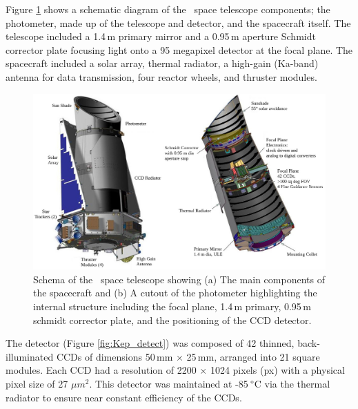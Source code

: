 Figure \ref{fig:KepSchema} shows a schematic diagram of the \Kepler~space telescope components; the photometer, made up of the telescope and detector, and the spacecraft itself.  The telescope included a 1.4\,m primary mirror and a 0.95\,m aperture Schmidt corrector plate focusing light onto a 95 megapixel detector at the focal plane. The spacecraft included a solar array, thermal radiator, a high-gain (Ka-band) antenna for data transmission, four reactor wheels, and thruster modules.

\begin{figure}[htbp]
    \centering
    \vspace{0.5em}
    \includegraphics[width=0.9\linewidth]{Chapter1/Kepler_schema_both.jpg}
    \vspace{0.5em}
    \caption[Schema of the \Kepler~spacecraft]{Schema of the \Kepler~space telescope showing (a) The main components of the spacecraft and (b) A cutout of the photometer highlighting the internal structure including the focal plane, 1.4\,m primary, 0.95\,m schmidt corrector plate, and the positioning of the CCD detector.}
    \label{fig:KepSchema}
\end{figure}

The detector (Figure \ref{fig:Kep_detect}) was composed of 42 thinned, back-illuminated CCDs of dimensions 50\,mm $\times$ 25\,mm, arranged into 21 square modules. Each CCD had a resolution of 2200 $\times$ 1024 pixels (px) with a physical pixel size of 27 $\mu m^2$. This detector was maintained at -85\,$\degree$C via the thermal radiator to ensure near constant efficiency of the CCDs.

